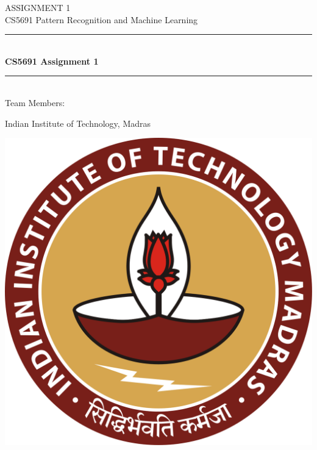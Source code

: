 \documentclass[12pt,a4paper]{article}
\begin{document}
    \begin{titlepage} 
        \begin{center}
        \large{ASSIGNMENT 1}\\
        \vspace{2em}
        \large {CS5691 Pattern Recognition and Machine Learning}
        \vspace{3em}
        
        \rule{0.9\linewidth}{0.5mm} \\[0.4cm]
        {\Large{\bfseries{CS5691 Assignment 1}}} \\
        \rule{0.9\linewidth}{0.5mm} \\[3 em]    
        
        Team Members: \\
        \vspace{0.5em}
        

        \vspace{1em}

        Indian Institute of Technology, Madras\\    
        
        \vspace{5em}    
        
            \includegraphics[scale=0.09]{images/iitmlogo.png}
        \end{center}
    \end{titlepage}
{\hypersetup{linkcolor=black}
\tableofcontents}
\break
\end{document}
